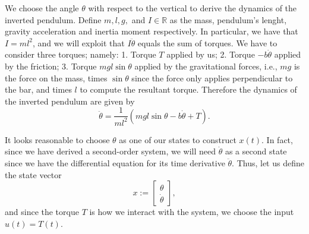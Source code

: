 \documentclass[11pt,a4paper,titlepage]{article}
\begin{document}
We choose the angle $\theta$ with respect to the vertical to derive the dynamics of the inverted pendulum. Define $m, l, g,$ and $I\in\mathbb{R}$ as the mass, pendulum's lenght, gravity acceleration and inertia moment respectively. In particular, we have that $I = ml^2$, and we will exploit that $I \ddot\theta$ equals the sum of torques. We have to consider three torques; namely: 1. Torque $T$ applied by us; 2. Torque $-b\dot\theta$ applied by the friction; 3. Torque $mgl \sin\theta$ applied by the gravitational forces, i.e., $mg$ is the force on the mass, times $\sin\theta$ since the force only applies perpendicular to the bar, and times $l$ to compute the resultant torque. Therefore the dynamics of the inverted pendulum are given by
\begin{equation}
\ddot\theta = \frac{1}{ml^2}\left(mgl\sin{\theta}-b\dot\theta + T\right).
	\label{eq: dyn}
\end{equation}

It looks reasonable to choose $\theta$ as one of our states to construct $x(t)$. In fact, since we have derived a second-order system, we will need $\dot\theta$ as a second state since we have the differential equation for its time derivative $\ddot\theta$. Thus, let us define the state vector
\begin{equation}
x := \begin{bmatrix}\theta \\ \dot\theta \end{bmatrix},
\end{equation}
and since the torque $T$ is how we interact with the system, we choose the input $u(t) = T(t)$.
\end{document}
